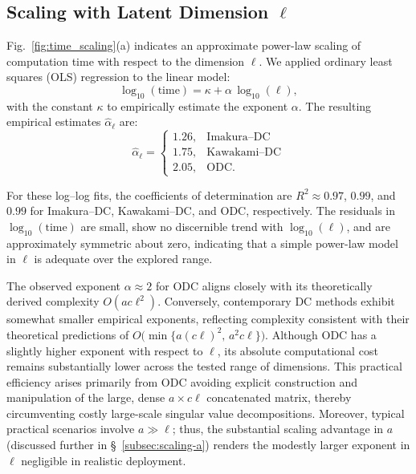 \documentclass[final,3p,times]{elsarticle}
\theoremstyle{plain}
\begin{document}
\subsection{Scaling with Latent Dimension \texorpdfstring{\(\ell\)}{l}}
\label{subsec:scaling-l}

Fig.~\ref{fig:time_scaling}(a) indicates an approximate power-law scaling of computation time with respect to the dimension \(\ell\). We applied ordinary least squares (OLS) regression to the linear model:
\begin{equation}
\log_{10}(\mathrm{time}) = \kappa + \alpha\,\log_{10}(\ell),
\end{equation}
with the constant \(\kappa\) to empirically estimate the exponent \(\alpha\). The resulting empirical estimates \(\widehat{\alpha}_{\ell}\) are:
\begin{equation}
\widehat{\alpha}_{\ell} =
\begin{cases}
1.26, & \text{Imakura--DC}\\[2pt]
1.75, & \text{Kawakami--DC}\\[2pt]
2.05, & \text{ODC}.
\end{cases}
\end{equation}

For these log--log fits, the coefficients of determination are \(R^2 \approx 0.97\), \(0.99\), and \(0.99\) for Imakura--DC, Kawakami--DC, and ODC, respectively. The residuals in \(\log_{10}(\mathrm{time})\) are small, show no discernible trend with \(\log_{10}(\ell)\), and are approximately symmetric about zero, indicating that a simple power-law model in \(\ell\) is adequate over the explored range.

The observed exponent \(\alpha \approx 2\) for ODC aligns closely with its theoretically derived complexity \(O(a c \ell^{2})\). Conversely, contemporary DC methods exhibit somewhat smaller empirical exponents, reflecting complexity consistent with their theoretical predictions of \(O\bigl(\min\{a(c \ell)^{2},\,a^{2} c \ell\}\bigr)\). Although ODC has a slightly higher exponent with respect to \(\ell\), its absolute computational cost remains substantially lower across the tested range of dimensions. This practical efficiency arises primarily from ODC avoiding explicit construction and manipulation of the large, dense \(a\times c \ell\) concatenated matrix, thereby circumventing costly large-scale singular value decompositions. Moreover, typical practical scenarios involve \(a \gg \ell\); thus, the substantial scaling advantage in \(a\) (discussed further in \S~\ref{subsec:scaling-a}) renders the modestly larger exponent in \(\ell\) negligible in realistic deployment.
\end{document}
